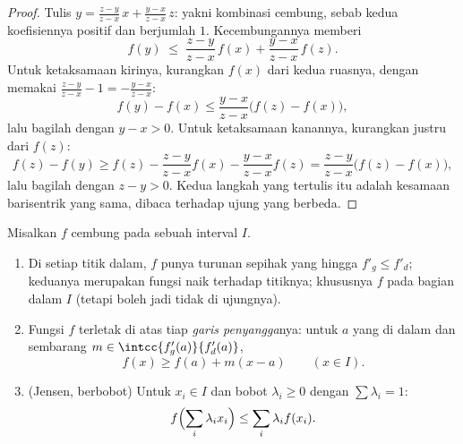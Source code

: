 \begin{proof}
Tulis $y = \frac{z - y}{z - x}\,x + \frac{y - x}{z - x}\,z$: yakni
kombinasi cembung, sebab kedua koefisiennya positif dan
berjumlah $1$. Kecembungannya memberi
\[
f(y) \;\leq\; \frac{z-y}{z-x}\,f(x) + \frac{y-x}{z-x}\,f(z).
\]
Untuk ketaksamaan kirinya, kurangkan $f(x)$ dari kedua ruasnya, dengan
memakai $\frac{z-y}{z-x} - 1 = -\frac{y-x}{z-x}$:
\[
f(y) - f(x) \leq \frac{y - x}{z - x}\bigl(f(z) - f(x)\bigr),
\]
lalu bagilah dengan $y - x > 0$. Untuk ketaksamaan kanannya, kurangkan
justru dari $f(z)$:
\[
f(z) - f(y) \geq f(z) - \frac{z-y}{z-x}f(x) -
\frac{y-x}{z-x}f(z)
= \frac{z - y}{z - x}\bigl(f(z) - f(x)\bigr),
\]
lalu bagilah dengan $z - y > 0$. Kedua langkah yang tertulis itu adalah
kesamaan barisentrik yang sama, dibaca terhadap ujung yang berbeda.
\end{proof}

\begin{theorem}\label{thm:b2:realfun:convexreg}
Misalkan $f$ cembung pada sebuah interval $I$.
\begin{enumerate}
  \item Di setiap titik dalam, $f$ punya turunan sepihak yang
        hingga $f'_g \leq f'_d$; keduanya merupakan fungsi naik
        terhadap titiknya; khususnya $f$  pada bagian
        dalam $I$ (tetapi boleh jadi tidak di ujungnya).
  \item Fungsi $f$ terletak di atas tiap \emph{garis penyangga}nya:
        untuk $a$ yang di dalam dan sembarang $m \in
        \intcc{f'_g(a)}{f'_d(a)}$,
        \[
        f(x) \geq f(a) + m(x - a) \qquad (x \in I).
        \]
  \item (Jensen, berbobot) Untuk $x_i \in I$ dan bobot $\lambda_i
        \geq 0$ dengan $\sum\lambda_i = 1$:
        \[
        f\Bigl(\sum_i \lambda_i x_i\Bigr) \leq \sum_i \lambda_i
        f(x_i) .\index{ketaksamaan Jensen}
        \]
\end{enumerate}
\end{theorem}

